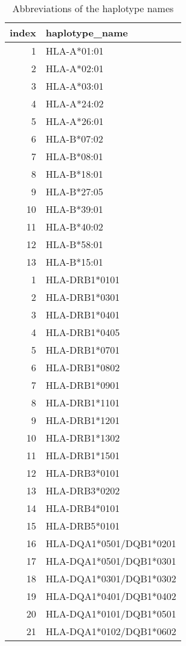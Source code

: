 \begin{table}[ht]
\centering
\begin{tabular}{rl}
  \hline
index & haplotype\_name \\ 
  \hline
  1 & HLA-A*01:01 \\ 
    2 & HLA-A*02:01 \\ 
    3 & HLA-A*03:01 \\ 
    4 & HLA-A*24:02 \\ 
    5 & HLA-A*26:01 \\ 
    6 & HLA-B*07:02 \\ 
    7 & HLA-B*08:01 \\ 
    8 & HLA-B*18:01 \\ 
    9 & HLA-B*27:05 \\ 
   10 & HLA-B*39:01 \\ 
   11 & HLA-B*40:02 \\ 
   12 & HLA-B*58:01 \\ 
   13 & HLA-B*15:01 \\ 
    1 & HLA-DRB1*0101 \\ 
    2 & HLA-DRB1*0301 \\ 
    3 & HLA-DRB1*0401 \\ 
    4 & HLA-DRB1*0405 \\ 
    5 & HLA-DRB1*0701 \\ 
    6 & HLA-DRB1*0802 \\ 
    7 & HLA-DRB1*0901 \\ 
    8 & HLA-DRB1*1101 \\ 
    9 & HLA-DRB1*1201 \\ 
   10 & HLA-DRB1*1302 \\ 
   11 & HLA-DRB1*1501 \\ 
   12 & HLA-DRB3*0101 \\ 
   13 & HLA-DRB3*0202 \\ 
   14 & HLA-DRB4*0101 \\ 
   15 & HLA-DRB5*0101 \\ 
   16 & HLA-DQA1*0501/DQB1*0201 \\ 
   17 & HLA-DQA1*0501/DQB1*0301 \\ 
   18 & HLA-DQA1*0301/DQB1*0302 \\ 
   19 & HLA-DQA1*0401/DQB1*0402 \\ 
   20 & HLA-DQA1*0101/DQB1*0501 \\ 
   21 & HLA-DQA1*0102/DQB1*0602 \\ 
   \hline
\end{tabular}
\caption{Abbreviations of the haplotype names} 
\label{tab:haplotype_abbreviations}
\end{table}

